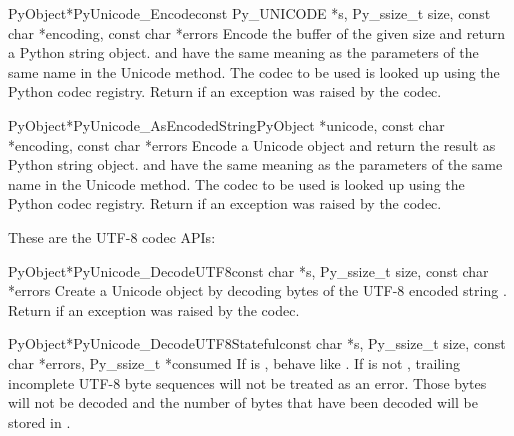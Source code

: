 \begin{cfuncdesc}{PyObject*}{PyUnicode_Encode}{const Py_UNICODE *s,
                                               Py_ssize_t size,
                                               const char *encoding,
                                               const char *errors}
  Encode the  buffer of the given size and return
  a Python string object.   and  have the
  same meaning as the parameters of the same name in the Unicode
   method.  The codec to be used is looked up using
  the Python codec registry.  Return \NULL{} if an exception was
  raised by the codec.
\end{cfuncdesc}

\begin{cfuncdesc}{PyObject*}{PyUnicode_AsEncodedString}{PyObject *unicode,
                                               const char *encoding,
                                               const char *errors}
  Encode a Unicode object and return the result as Python string
  object.  and  have the same meaning as the
  parameters of the same name in the Unicode  method.
  The codec to be used is looked up using the Python codec registry.
  Return \NULL{} if an exception was raised by the codec.
\end{cfuncdesc}


These are the UTF-8 codec APIs:

\begin{cfuncdesc}{PyObject*}{PyUnicode_DecodeUTF8}{const char *s,
                                               Py_ssize_t size,
                                               const char *errors}
  Create a Unicode object by decoding  bytes of the UTF-8
  encoded string . Return \NULL{} if an exception was raised
  by the codec.
\end{cfuncdesc}

\begin{cfuncdesc}{PyObject*}{PyUnicode_DecodeUTF8Stateful}{const char *s,
                                               Py_ssize_t size,
                                               const char *errors,
                                               Py_ssize_t *consumed}
  If  is \NULL{}, behave like .
  If  is not \NULL{}, trailing incomplete UTF-8 byte sequences
  will not be treated as an error. Those bytes will not be decoded and the
  number of bytes that have been decoded will be stored in .
\end{cfuncdesc}

